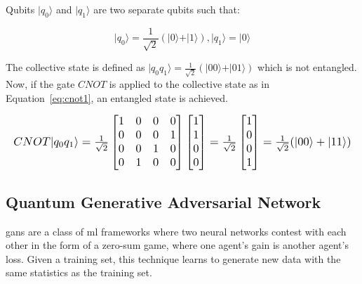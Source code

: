 Qubits $\vert q_0 \rangle$ and $\vert q_1 \rangle$ are two separate qubits such 
that:

\begin{linenomath}
\begin{equation}
\vert q_0 \rangle = \frac{1}{\sqrt{2}} (\vert 0 \rangle + \vert 1 \rangle), 
\vert q_1 \rangle = \vert 0 \rangle
\label{eq:q0}
\end{equation}
\end{linenomath}

The collective state is defined as $\vert q_0q_1 \rangle = \frac{1}{\sqrt{2}} 
(\vert 00 \rangle + \vert 01 \rangle)$ which is not entangled. Now, if the gate
$CNOT$ is applied to the collective state as in Equation~\ref{eq:cnot1}, an
entangled state is achieved.

\begin{linenomath}
\begin{equation}
\resizebox{\hsize}{!}{$CNOT\vert q_0q_1 \rangle = \frac{1}{\sqrt{2}} \begin{bmatrix} 1 & 0 & 0 & 0 \\ 0 & 0 & 0 & 1 \\ 0 & 0 & 1 & 0 \\ 0 & 1 & 0 & 0 \end{bmatrix} \begin{bmatrix} 1\\1\\0\\0 \end{bmatrix} = \frac{1}{\sqrt{2}} \begin{bmatrix} 1\\0\\0\\1 \end{bmatrix} = \frac{1}{\sqrt{2}} (\vert 00 \rangle + \vert 11 \rangle)$}
\label{eq:cnot1}
\end{equation}
\end{linenomath}

\subsection{Quantum Generative Adversarial Network}
\label{sec:qgans}

\glspl{gan} are a class of \gls{ml} frameworks where two neural networks contest
with each other in the form of a zero-sum game, where one agent's gain is another
agent's loss. Given a training set, this technique learns to generate new data 
with the same statistics as the training set. 

